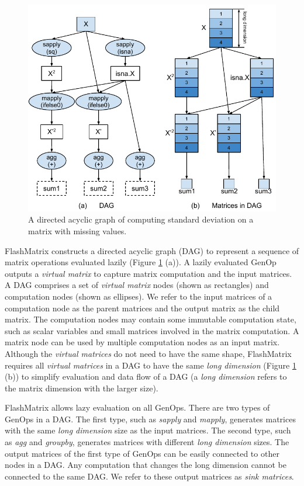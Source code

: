 \begin{figure}
	\centering
	\includegraphics[scale=0.7]{./sd.pdf}
	\caption{A directed acyclic graph of computing standard deviation on
	a matrix with missing values.}
	\label{fig:DAG}
\end{figure}

FlashMatrix constructs a directed acyclic graph (DAG) to represent a sequence
of matrix operations evaluated lazily (Figure \ref{fig:DAG} (a)). A lazily
evaluated GenOp outputs a \textit{virtual matrix} to capture matrix computation
and the input matrices. A
DAG comprises a set of \textit{virtual matrix} nodes (shown as rectangles)
and computation nodes (shown as ellipses). We refer to the input matrices of
a computation node as the parent matrices and the output matrix as the child matrix.
The computation nodes may contain some immutable computation state, such as
scalar variables and small matrices involved in the matrix computation.
A matrix node can be used by multiple computation nodes as
an input matrix. Although the \textit{virtual matrices} do not need to have
the same shape, FlashMatrix requires all \textit{virtual matrices} in a DAG
to have the same \textit{long dimension} (Figure \ref{fig:DAG} (b)) to
simplify evaluation and data flow of a DAG (a \textit{long dimension}
refers to the matrix dimension with the larger size).

FlashMatrix allows lazy evaluation on all GenOps. There are two types of GenOps
in a DAG. The first type, such as \textit{sapply} and \textit{mapply}, generates
matrices with the same \textit{long dimension} size as the input matrices.
The second type, such as \textit{agg} and \textit{groupby}, generates matrices
with different \textit{long dimension} sizes. The output matrices of the first
type of GenOps can be easily connected to other nodes in a DAG. Any computation
that changes the long dimension
cannot be connected to the same DAG.  We refer to these output matrices as
\textit{sink matrices}.

